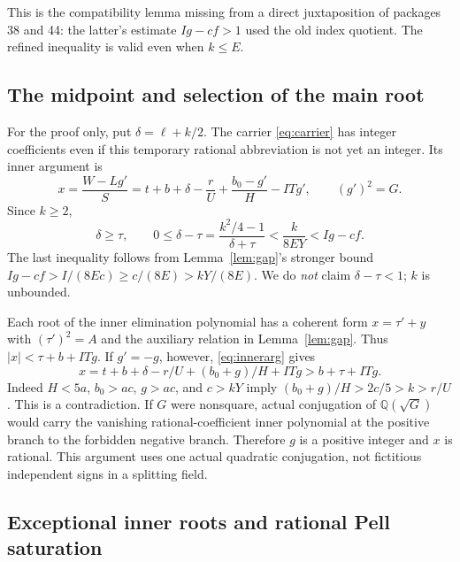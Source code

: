 \documentclass[11pt,a4paper]{article}
\newcommand{\Q}{\mathbb Q}
\theoremstyle{definition}
\theoremstyle{remark}
\numberwithin{equation}{section}
\begin{document}
This is the compatibility lemma missing from a direct juxtaposition of
packages 38 and 44: the latter's estimate $Ig-cf>1$ used the old
index quotient. The refined inequality is valid even when $k\le E$.

\subsection{The midpoint and selection of the main root}

For the proof only, put $\delta=\ell+k/2$.
The carrier \eqref{eq:carrier} has integer coefficients even if this
temporary rational abbreviation is not yet an integer. Its inner
argument is
\begin{equation}
 x=\frac{W-Lg'}{S}
   =t+b+\delta-\frac rU+\frac{b_0-g'}H-ITg',
 \qquad (g')^2=G.
 \label{eq:innerarg}
\end{equation}
Since $k\ge2$,
\begin{equation}
 \delta\ge\tau,\qquad
 0\le\delta-\tau
 =\frac{k^2/4-1}{\delta+\tau}
 <\frac{k}{8EY}<Ig-cf.
 \label{eq:midpointgap}
\end{equation}
The last inequality follows from Lemma~\ref{lem:gap}'s stronger bound
$Ig-cf>I/(8Ec)\ge c/(8E)>kY/(8E)$.
We do \emph{not} claim $\delta-\tau<1$; $k$ is unbounded.

Each root of the inner elimination polynomial has a coherent form
$x=\tau'+y$ with $(\tau')^2=A$ and the auxiliary relation in
Lemma~\ref{lem:gap}. Thus $|x|<\tau+b+ITg$.
If $g'=-g$, however, \eqref{eq:innerarg} gives
\[
 x=t+b+\delta-r/U+(b_0+g)/H+ITg>b+\tau+ITg.
\]
Indeed $H<5a$, $b_0>ac$, $g>ac$, and $c>kY$ imply
$(b_0+g)/H>2c/5>k>r/U$. This is a contradiction.
If $G$ were nonsquare, actual conjugation of $\Q(\sqrt G)$ would
carry the vanishing rational-coefficient inner polynomial at the
positive branch to the forbidden negative branch. Therefore $g$ is a
positive integer and $x$ is rational. This argument uses one actual
quadratic conjugation, not fictitious independent signs in a splitting field.

\subsection{Exceptional inner roots and rational Pell saturation}
\end{document}
